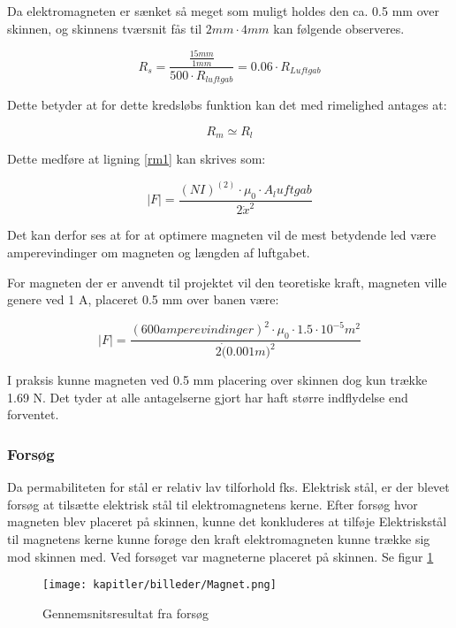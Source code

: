 Da elektromagneten er sænket så meget som muligt holdes den ca. 0.5 mm over skinnen, og skinnens tværsnit fås til $2mm \cdot 4mm$ kan følgende observeres.

\begin{equation}
R_s =
\frac{\frac{15 mm}{1 mm} }
{ 500 \cdot R_{luftgab} }= 0.06\cdot R_{Luftgab}
	\end{equation}

Dette betyder at for dette kredsløbs funktion kan det med rimelighed antages at:

\begin{equation}
R_m \simeq R_l
	\end{equation}

Dette medføre at ligning \ref{rm1} kan skrives som:

\begin{equation}
\mid F \mid = \frac{(NI)^(2) \cdot \mu_0 \cdot A_luftgab } {2 \dot x^2}
\end{equation}

Det kan derfor ses at for at optimere magneten vil de mest betydende led være amperevindinger om magneten og længden af luftgabet.

For magneten der er anvendt til projektet vil den teoretiske kraft, magneten ville genere ved 1 A, placeret 0.5 mm over banen være: %

\begin{equation}
\mid F \mid = \frac{(600 amperevindinger)^2 \cdot \mu_0 \cdot 1.5 \cdot 10^{-5} m^2 } {2 \dot (0.001m)^2}
\end{equation}

I praksis kunne magneten ved 0.5 mm placering over skinnen dog kun trække  1.69 N. Det tyder at alle antagelserne gjort har haft større indflydelse end forventet.

\subsubsection{Forsøg}
Da permabiliteten for stål er relativ lav tilforhold fks. Elektrisk stål, er der blevet forsøg at tilsætte elektrisk stål til elektromagnetens kerne. Efter forsøg hvor magneten blev placeret på skinnen, kunne det konkluderes at tilføje Elektriskstål til magnetens kerne kunne forøge den kraft elektromagneten kunne trække sig mod skinnen med.
Ved forsøget var magneterne placeret på skinnen. Se figur \ref{fig:Magnet}

\begin{figure}[ht]
	\centering
	\texttt{[image: kapitler/billeder/Magnet.png]}
	\caption{Gennemsnitsresultat fra forsøg}
	\label{fig:Magnet}
\end{figure}


